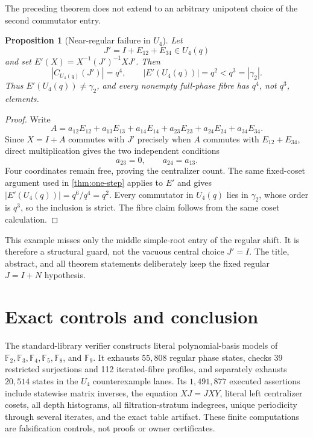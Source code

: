 \documentclass[10pt,a4paper]{amsart}
\newtheorem{proposition}[theorem]{Proposition}
\theoremstyle{definition}
\theoremstyle{remark}
\newcommand{\F}{\mathbb F}
\begin{document}
The preceding theorem does not extend to an arbitrary unipotent choice of
the second commutator entry.

\begin{proposition}[Near-regular failure in $U_4$]
\label{prop:counterexample}
Let
\[
                       J'=I+E_{12}+E_{34}\in U_4(q)
\]
and set $E'(X)=X^{-1}(J')^{-1}XJ'$.  Then
\begin{equation}
 |C_{U_4(q)}(J')|=q^4,\qquad |E'(U_4(q))|=q^2<q^3=|\gamma_2|.
 \label{eq:counterexample-counts}
\end{equation}
Thus $E'(U_4(q))\ne\gamma_2$, and every nonempty full-phase fibre has
$q^4$, not $q^3$, elements.
\end{proposition}

\begin{proof}
Write
\[
 A=a_{12}E_{12}+a_{13}E_{13}+a_{14}E_{14}
   +a_{23}E_{23}+a_{24}E_{24}+a_{34}E_{34}.
\]
Since $X=I+A$ commutes with $J'$ precisely when $A$ commutes with
$E_{12}+E_{34}$, direct multiplication gives the two independent
conditions
\[
                         a_{23}=0,\qquad a_{24}=a_{13}.
\]
Four coordinates remain free, proving the centralizer count.  The same
fixed-coset argument used in \cref{thm:one-step} applies to $E'$ and gives
$|E'(U_4(q))|=q^6/q^4=q^2$.  Every commutator in $U_4(q)$ lies in
$\gamma_2$, whose order is $q^3$, so the inclusion is strict.  The fibre
claim follows from the same coset calculation.
\end{proof}

This example misses only the middle simple-root entry of the regular shift.
It is therefore a structural guard, not the vacuous central choice $J'=I$.
The title, abstract, and all theorem statements deliberately keep the fixed
regular $J=I+N$ hypothesis.

\section{Exact controls and conclusion}
\label{sec:controls}

The standard-library verifier constructs literal polynomial-basis models of
$\F_2,\F_3,\F_4,\F_5,\F_8$, and $\F_9$.  It exhausts $55{,}808$ regular
phase states, checks 39 restricted surjections and 112 iterated-fibre
profiles, and separately exhausts $20{,}514$ states in the $U_4$
counterexample lanes.  Its $1{,}491{,}877$ executed assertions include
statewise matrix inverses, the equation $XJ=JXY$, literal left centralizer
cosets, all depth histograms, all filtration-stratum indegrees, unique
periodicity through several iterates, and the exact table artifact.  These
finite computations are falsification controls, not proofs or owner
certificates.
\end{document}
